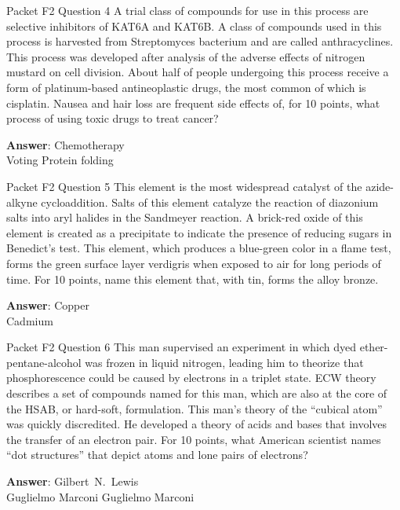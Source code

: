 \begin{frame}{Packet F2 Question 4}
A trial class of compounds for use in this process are selective   inhibitors of KAT6A and KAT6B. A class of compounds used in this process is harvested from Streptomyces bacterium and are called anthracyclines. This process was developed after analysis of the adverse effects of nitrogen mustard on cell division. About half of people undergoing this process receive a form of platinum-based antineoplastic drugs, the most common of which is cisplatin. Nausea and     hair loss are frequent side effects of, for 10 points, what process of using toxic drugs to treat cancer?    

\textbf{Answer}: Chemotherapy\\
 Voting
 Protein folding
\end{frame}

\begin{frame}{Packet F2 Question 5}
This element is the most   widespread catalyst of the azide-alkyne cycloaddition. Salts   of this element   catalyze the reaction of diazonium salts   into aryl halides in the Sandmeyer reaction.   A brick-red oxide of this element is created as a precipitate to indicate the presence of reducing sugars in Benedict’s test. This element, which produces a blue-green color in a flame test, forms the green surface layer verdigris when exposed to air for long periods of time. For 10 points, name this element that, with tin, forms the alloy bronze.

\textbf{Answer}: Copper\\
 Cadmium
\end{frame}

\begin{frame}{Packet F2 Question 6}
This man supervised an     experiment in which dyed ether-pentane-alcohol was frozen in liquid nitrogen, leading him to theorize that phosphorescence could be caused by electrons in a triplet state. ECW theory describes a set of compounds named for   this man, which are also at the core of the HSAB, or hard-soft, formulation.   This man’s theory of the “cubical atom” was quickly discredited. He developed a theory of acids and bases that involves the transfer of an electron pair. For 10 points, what American scientist names “dot structures” that   depict atoms and lone   pairs of electrons?

\textbf{Answer}: Gilbert\ N.\ Lewis\\
 Guglielmo Marconi
 Guglielmo Marconi
\end{frame}

